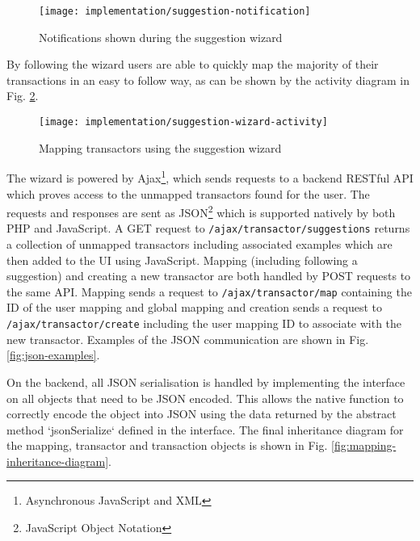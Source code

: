 \begin{figure}[h]
    \centering
    \texttt{[image: implementation/suggestion-notification]}
    \caption{Notifications shown during the suggestion wizard}
    \label{fig:suggestion-notification}
\end{figure}

By following the wizard users are able to quickly map the majority of their transactions in an easy to follow way, as can be shown by the activity diagram in Fig. \ref{fig:suggestion-wizard-activity}.

\begin{figure}[h]
    \centering
    \texttt{[image: implementation/suggestion-wizard-activity]}
    \caption{Mapping transactors using the suggestion wizard}
    \label{fig:suggestion-wizard-activity}
    
    \begin{comment}
(start)->(Map Transactor)-><a>->(end)
<a>->(Map Transactor)
    \end{comment}
\end{figure}

The wizard is powered by Ajax\footnote{Asynchronous JavaScript and XML}, which sends requests to a backend RESTful API which proves access to the unmapped transactors found for the user. The requests and responses are sent as JSON\footnote{JavaScript Object Notation} which is supported natively by both PHP and JavaScript. A GET request to \lstinline{/ajax/transactor/suggestions} returns a collection of unmapped transactors including associated examples which are then added to the UI using JavaScript.
%
Mapping (including following a suggestion) and creating a new transactor are both handled by POST requests to the same API. Mapping sends a request to \lstinline{/ajax/transactor/map} containing the ID of the user mapping and global mapping  and creation sends a request to \lstinline{/ajax/transactor/create} including the user mapping ID to associate with the new transactor. 
%
Examples of the JSON communication are shown in Fig. \ref{fig:json-examples}.

On the backend, all JSON serialisation is handled by implementing the  interface on all objects that need to be JSON encoded. This allows the native function  to correctly encode the object into JSON using the data returned by the abstract method `jsonSerialize` defined in the interface. The final inheritance diagram for the mapping, transactor and transaction objects is shown in Fig. \ref{fig:mapping-inheritance-diagram}.

